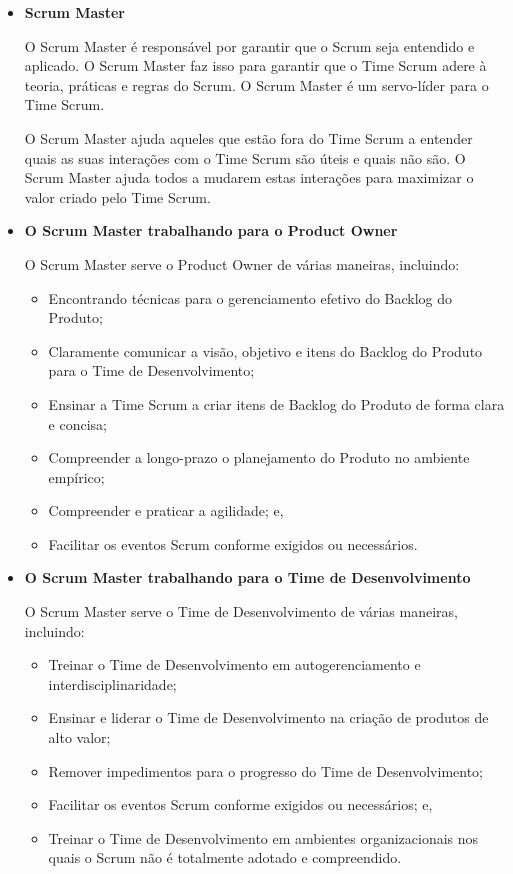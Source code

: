 \begin{itemize}
\item \textbf{Scrum Master}
\label{sub:Scrum Master}

O Scrum Master é responsável por garantir que o Scrum seja entendido e aplicado. O Scrum
Master faz isso para garantir que o Time Scrum adere à teoria, práticas e regras do Scrum. O
Scrum Master é um servo-líder para o Time Scrum.

O Scrum Master ajuda aqueles que estão fora do Time Scrum a entender quais as suas
interações com o Time Scrum são úteis e quais não são. O Scrum Master ajuda todos a
mudarem estas interações para maximizar o valor criado pelo Time Scrum.

\item \textbf{O Scrum Master trabalhando para o Product Owner}
\label{subs:O Scrum Master trabalhando para o Product Owner}

O Scrum Master serve o Product Owner de várias maneiras, incluindo:

\begin{itemize}

\item  Encontrando técnicas para o gerenciamento efetivo do Backlog do Produto;
\item Claramente comunicar a visão, objetivo e itens do Backlog do Produto para o Time de
  Desenvolvimento;
\item Ensinar a Time Scrum a criar itens de Backlog do Produto de forma clara e concisa;
\item  Compreender a longo-prazo o planejamento do Produto no ambiente empírico;
\item  Compreender e praticar a agilidade; e,
\item  Facilitar os eventos Scrum conforme exigidos ou necessários.
\end{itemize}



\item \textbf{O Scrum Master trabalhando para o Time de Desenvolvimento}
\label{subs:O Scrum Master trabalhando para o Time de Desenvolvimento}

O Scrum Master serve o Time de Desenvolvimento de várias maneiras, incluindo:

\begin{itemize}
\item  Treinar o Time de Desenvolvimento em autogerenciamento e interdisciplinaridade;
\item  Ensinar e liderar o Time de Desenvolvimento na criação de produtos de alto valor;
\item  Remover impedimentos para o progresso do Time de Desenvolvimento;
\item  Facilitar os eventos Scrum conforme exigidos ou necessários; e,
\item  Treinar o Time de Desenvolvimento em ambientes organizacionais nos quais o Scrum não é
totalmente adotado e compreendido.
\end{itemize}



\end{itemize}
